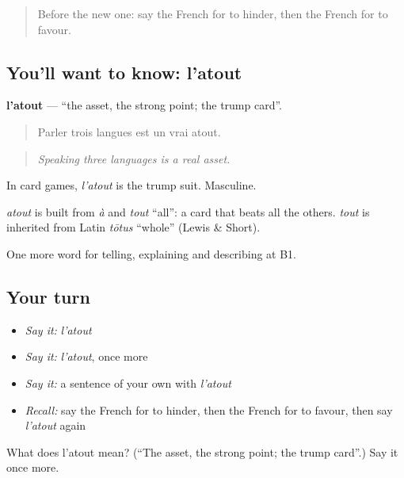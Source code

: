 \begin{quote}
Before the new one: say the French for to hinder, then the French for to favour.
\end{quote}

\subsection*{You'll want to know: l'atout}
\textbf{l'atout} — \textquotedblleft{}the asset, the strong point; the trump card\textquotedblright{}.

\begin{quote}
Parler trois langues est un vrai atout.
\end{quote}

\begin{quote}
\emph{Speaking three languages is a real asset.}
\end{quote}

In card games, \emph{l'atout} is the trump suit. Masculine.

\begin{cousinweb}
\emph{atout} is built from \emph{à} and \emph{tout} \textquotedblleft{}all\textquotedblright{}: a card that beats all the others. \emph{tout} is inherited from Latin \emph{tōtus} \textquotedblleft{}whole\textquotedblright{} (Lewis \& Short).
\end{cousinweb}

\begin{grammarlens}[title={What you've built}]
One more word for telling, explaining and describing at B1.
\end{grammarlens}

\subsection*{Your turn}
\begin{itemize}
\raggedright
  \item \emph{Say it:} \emph{l'atout}
  \item \emph{Say it:} \emph{l'atout}, once more
  \item \emph{Say it:} a sentence of your own with \emph{l'atout}
  \item \emph{Recall:} say the French for to hinder, then the French for to favour, then say \emph{l'atout} again
\end{itemize}

\begin{tcolorbox}[breakable,colback=teal!4,colframe=teal!35!black,title={Before you move on}]
What does l'atout mean? (\textquotedblleft{}The asset, the strong point; the trump card\textquotedblright{}.) Say it once more.
\end{tcolorbox}
